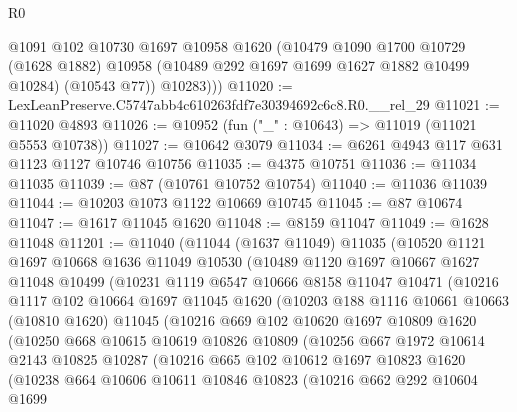 \begin{lexlean}{R0}
\begin{coremodule}
          @1091
          @102
          @10730
          @1697
          @10958
          @1620
          (@10479
            @1090
            @1700
            @10729
            (@1628 @1882)
            @10958
            (@10489 @292 @1697 @1699 @1627 @1882 @10499 @10284)
            (@10543 @77))
          @10283)))
@11020 := LexLeanPreserve.C5747abb4c610263fdf7e30394692c6c8.R0.__rel_29
@11021 := @11020 @4893
@11026 := @10952 (fun ("_" : @10643) => @11019 (@11021 @5553 @10738))
@11027 := @10642 @3079
@11034 := @6261 @4943 @117 @631 @1123 @1127 @10746 @10756
@11035 := @4375 @10751
@11036 := @11034 @11035
@11039 := @87 (@10761 @10752 @10754)
@11040 := @11036 @11039
@11044 := @10203 @1073 @1122 @10669 @10745
@11045 := @87 @10674
@11047 := @1617 @11045 @1620
@11048 := @8159 @11047
@11049 := @1628 @11048
@11201 := @11040
    (@11044
      (@1637 @11049)
      @11035
      (@10520
        @1121
        @1697
        @10668
        @1636
        @11049
        @10530
        (@10489
          @1120
          @1697
          @10667
          @1627
          @11048
          @10499
          (@10231
            @1119
            @6547
            @10666
            @8158
            @11047
            @10471
            (@10216
              @1117
              @102
              @10664
              @1697
              @11045
              @1620
              (@10203
                @188
                @1116
                @10661
                @10663
                (@10810 @1620)
                @11045
                (@10216
                  @669
                  @102
                  @10620
                  @1697
                  @10809
                  @1620
                  (@10250
                    @668
                    @10615
                    @10619
                    @10826
                    @10809
                    (@10256
                      @667
                      @1972
                      @10614
                      @2143
                      @10825
                      @10287
                      (@10216
                        @665
                        @102
                        @10612
                        @1697
                        @10823
                        @1620
                        (@10238
                          @664
                          @10606
                          @10611
                          @10846
                          @10823
                          (@10216
                            @662
                            @292
                            @10604
                            @1699

\end{coremodule}
\end{lexlean}
